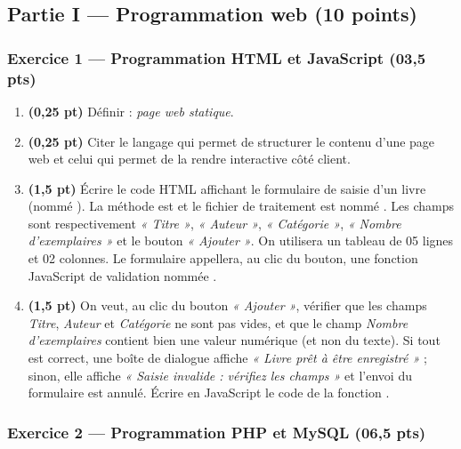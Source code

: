 \subsection*{Partie I — Programmation web \hfill (10 points)}

\subsubsection*{Exercice 1 — Programmation HTML et JavaScript \hfill (03,5 pts)}

\begin{enumerate}[label=\textbf{\arabic*.}]
\item \textbf{(0,25 pt)} Définir : \emph{page web statique}.
\item \textbf{(0,25 pt)} Citer le langage qui permet de structurer le contenu
d'une page web et celui qui permet de la rendre interactive côté client.
\item \textbf{(1,5 pt)} Écrire le code HTML affichant le formulaire de saisie
d'un livre (nommé ). La méthode est  et le fichier de
traitement est nommé . Les champs sont respectivement
\emph{« Titre »}, \emph{« Auteur »}, \emph{« Catégorie »}, \emph{« Nombre
d'exemplaires »} et le bouton \emph{« Ajouter »}. On utilisera un tableau de 05
lignes et 02 colonnes. Le formulaire appellera, au clic du bouton, une fonction
JavaScript de validation nommée .
\item \textbf{(1,5 pt)} On veut, au clic du bouton \emph{« Ajouter »}, vérifier
que les champs \emph{Titre}, \emph{Auteur} et \emph{Catégorie} ne sont pas vides,
et que le champ \emph{Nombre d'exemplaires} contient bien une valeur numérique
(et non du texte). Si tout est correct, une boîte de dialogue affiche
\emph{« Livre prêt à être enregistré »} ; sinon, elle affiche
\emph{« Saisie invalide : vérifiez les champs »} et l'envoi du formulaire est
annulé. Écrire en JavaScript le code de la fonction .
\end{enumerate}

\subsubsection*{Exercice 2 — Programmation PHP et MySQL \hfill (06,5 pts)}

